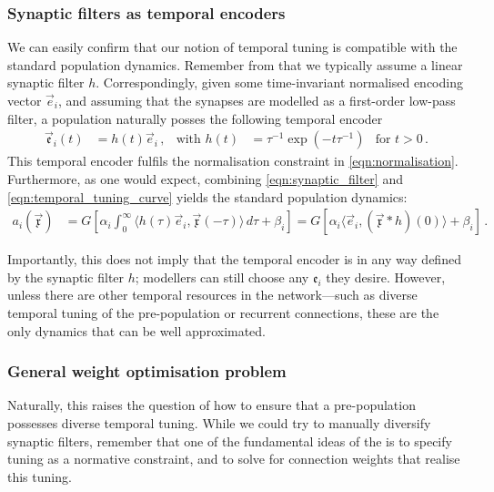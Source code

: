 \subsubsection{Synaptic filters as temporal encoders}
We can easily confirm that our notion of temporal tuning is compatible with the standard \NEF population dynamics.
Remember from  that we typically assume a linear synaptic filter $h$.
Correspondingly, given some time-invariant normalised encoding vector $\vec e_i$, and assuming that the synapses are modelled as a first-order low-pass filter, a population naturally posses the following temporal encoder
\begin{align}
	\vec{\mathfrak{e}}_i(t)
		&= h(t) \vec e_i \,, & \text{with } h(t) &= \tau^{-1} \exp(-t \tau^{-1}) & \text{for } t > 0 \,.
	\label{eqn:synaptic_filter}
\end{align}
This temporal encoder fulfils the normalisation constraint in \cref{eqn:normalisation}.
Furthermore, as one would expect, combining \cref{eqn:synaptic_filter} and \cref{eqn:temporal_tuning_curve} yields the standard \NEF population dynamics:
\begin{align}
	a_i(\vec{\mathfrak{x}})
		&= G\left[ \alpha_i \! \int_{0}^\infty \!\!\! \big\langle h(\tau) \vec{e}_i, \vec{\mathfrak{x}}(-\tau) \big\rangle \,\mathit{d\tau} + \beta_i \right]
		 = G\left[ \alpha_i \big\langle \vec e_i, (\vec{\mathfrak{x}} \ast h)(0) \big\rangle + \beta_i \right] \,.
	\label{eqn:synaptic_filter_tuning_curve}
\end{align}

Importantly, this does not imply that the temporal encoder is in any way defined by the synaptic filter $h$; modellers can still choose any $\mathfrak{e}_i$ they desire.
However, unless there are other temporal resources in the network---such as diverse temporal tuning of the pre-population or recurrent connections, these are the only dynamics that can be well approximated.


\subsubsection{General weight optimisation problem}
Naturally, this raises the question of how to ensure that a pre-population possesses diverse temporal tuning.
While we could try to manually diversify synaptic filters, remember that one of the fundamental ideas of the \NEF is to specify tuning as a normative constraint, and to solve for connection weights that realise this tuning.

